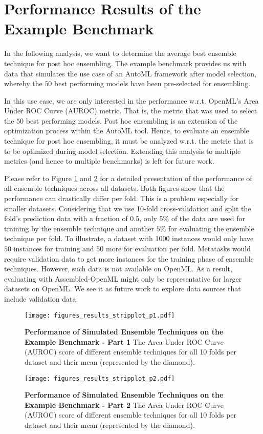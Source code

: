 \documentclass[11pt]{article}
\begin{document}
\section{Performance Results of the Example Benchmark}
\label{appdx:result_figure}
In the following analysis, we want to determine the average best ensemble technique for post hoc ensembling. The example benchmark provides us with data that simulates the use case of an AutoML framework after model selection, whereby the $50$ best performing models have been pre-selected for ensembling.


In this use case, we are only interested in the performance w.r.t. OpenML's Area Under ROC Curve (AUROC) metric. That is, the metric that was used to select the $50$ best performing models. 
Post hoc ensembling is an extension of the optimization process within the AutoML tool. Hence, to evaluate an ensemble technique for post hoc ensembling, it must be analyzed w.r.t. the metric that is to be optimized during model selection. Extending this analysis to multiple metrics (and hence to multiple benchmarks) is left for future work. 

Please refer to Figure \ref{fig:results} and \ref{fig:resultsp2} for a detailed presentation of the performance of all ensemble techniques across all datasets. 
Both figures show that the performance can drastically differ per fold. This is a problem especially for smaller datasets. 
Considering that we use 10-fold cross-validation and split the fold's prediction data with a fraction of $0.5$, only $5\%$ of the data are used for training by the ensemble technique and another $5\%$ for evaluating the ensemble technique per fold. To illustrate, a dataset with 1000 instances would only have $50$ instances for training and $50$ more for evaluation per fold. 
Metatasks would require validation data to get more instances for the training phase of ensemble techniques. However, such data is not available on OpenML. 
As a result, evaluating with Assembled-OpenML might only be representative for larger datasets on OpenML.
We see it as future work to explore data sources that include validation data.

\begin{figure}[h!]
  \centering
  \texttt{[image: figures\_results\_stripplot\_p1.pdf]}
  \caption{\textbf{Performance of Simulated Ensemble Techniques on the Example Benchmark - Part 1}
            The Area Under ROC Curve (AUROC) score of different ensemble techniques for all 10 folds per dataset and their mean (represented by the diamond). 
            }
    \label{fig:results}
\end{figure}
\begin{figure}[h!]
  \centering
  \texttt{[image: figures\_results\_stripplot\_p2.pdf]}
  \caption{\textbf{Performance of Simulated Ensemble Techniques on the Example Benchmark - Part 2}
            The Area Under ROC Curve (AUROC) score of different ensemble techniques for all 10 folds per dataset and their mean (represented by the diamond). 
            }
    \label{fig:resultsp2}
\end{figure}
\end{document}
